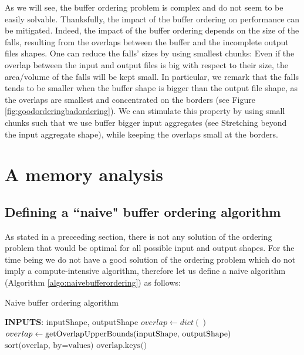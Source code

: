 \documentclass[conference]{IEEEtran}
\begin{document}
As we will see, the buffer ordering problem is complex and do not seem to be easily solvable.
Thanksfully, the impact of the buffer ordering on performance can be mitigated.
Indeed, the impact of the buffer ordering depends on the size of the falls, resulting from the overlaps between the buffer and the incomplete output files shapes.
One can reduce the falls' sizes by using smallest chunks:
Even if the overlap between the input and output files is big with respect to their size, the area/volume of the falls will be kept small.
In particular, we remark that the falls tends to be smaller when the buffer shape is bigger than the output file shape, as the overlaps are smallest and concentrated on the borders (see Figure \ref{fig:goodorderingbadordering}).
We can stimulate this property by using small chunks such that we use buffer bigger input aggregates (see Stretching beyond the input aggregate shape), while keeping the overlaps small at the borders.

\section*{A memory analysis}

\subsection{Defining a ``naive" buffer ordering algorithm}
As stated in a preceeding section, there is not any solution of the ordering problem that would be optimal for all possible input and output shapes.
For the time being we do not have a good solution of the ordering problem which do not imply a compute-intensive algorithm, therefore let us define a naive algorithm (Algorithm \ref{algo:naivebufferordering}) as follows:

\begin{algorithm}[H]
  \caption{Naive buffer ordering algorithm}
  \begin{algorithmic}[1]
  \STATE \textbf{INPUTS}: inputShape, outputShape
  \STATE $overlap \leftarrow dict()$
  \STATE $overlap \leftarrow \textrm{getOverlapUpperBounds(\textrm{inputShape, outputShape})}$
  \STATE $\textrm{sort(overlap, by=values)}$
  \RETURN $\textrm{overlap.keys()}$

  \end{algorithmic}
  \label{algo:naivebufferordering}
\end{algorithm}
\end{document}
